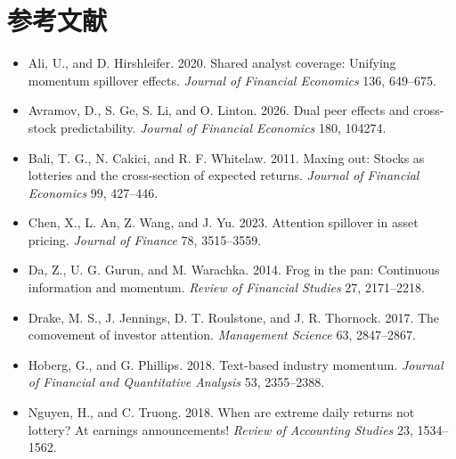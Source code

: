\documentclass[UTF8,a4paper,11pt]{ctexart}
\begin{document}
\section*{参考文献}
\begin{itemize}
\item Ali, U., and D. Hirshleifer. 2020. Shared analyst coverage: Unifying momentum spillover effects. \emph{Journal of Financial Economics} 136, 649--675.
\item Avramov, D., S. Ge, S. Li, and O. Linton. 2026. Dual peer effects and cross-stock predictability. \emph{Journal of Financial Economics} 180, 104274.
\item Bali, T. G., N. Cakici, and R. F. Whitelaw. 2011. Maxing out: Stocks as lotteries and the cross-section of expected returns. \emph{Journal of Financial Economics} 99, 427--446.
\item Chen, X., L. An, Z. Wang, and J. Yu. 2023. Attention spillover in asset pricing. \emph{Journal of Finance} 78, 3515--3559.
\item Da, Z., U. G. Gurun, and M. Warachka. 2014. Frog in the pan: Continuous information and momentum. \emph{Review of Financial Studies} 27, 2171--2218.
\item Drake, M. S., J. Jennings, D. T. Roulstone, and J. R. Thornock. 2017. The comovement of investor attention. \emph{Management Science} 63, 2847--2867.
\item Hoberg, G., and G. Phillips. 2018. Text-based industry momentum. \emph{Journal of Financial and Quantitative Analysis} 53, 2355--2388.
\item Nguyen, H., and C. Truong. 2018. When are extreme daily returns not lottery? At earnings announcements! \emph{Review of Accounting Studies} 23, 1534--1562.
\end{itemize}
\end{document}
